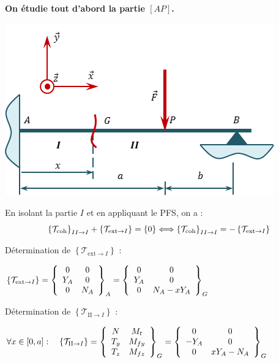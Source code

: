 \documentclass[10pt,fleqn]{article} %
\begin{document}
\ifprof
\begin{corrige}

\textbf{On étudie tout d'abord la partie $[AP]$.}
\begin{center}
\includegraphics[width=.45\textwidth]{images/fig_02}
\end{center}

%
%
%
%

En isolant la partie $I$ et en appliquant le PFS, on a : 
$$
\torseurscoh_{II \rightarrow I} + \left\{\mathcal{T}_{\text{ext}\rightarrow I}\right\}  = \{0\}
\Longleftrightarrow \torseurscoh_{II \rightarrow I} =  - \left\{\mathcal{T}_{\text{ext}\rightarrow I}\right\}
$$ 

Détermination de $\left\{\mathcal{T}_{\text{ext}\rightarrow I}\right\}$ :

$\left\{\mathcal{T}_{\text{ext}\rightarrow I}\right\}
=  \torseurcol{0}{Y_A}{0}{0}{0}{N_A}{A} 
=  \torseurcol{0}{Y_A}{0}{0}{0}{N_A-xY_A}{G} 
$ 


Détermination de $ \left\{\mathcal{T}_{\text{II}\rightarrow I}\right\}$ :

$
\forall x \in [0,a] : \quad 
\left\{\mathcal{T}_{\text{II}\rightarrow I}\right\} 
= \torseurcol{N}{T_y}{T_z}{M_t}{M_{fy}}{M_{fz}}{G}
=  \torseurcol{0}{-Y_A}{0}{0}{0}{xY_A-N_A}{G} 
$

\end{corrige}
\end{document}
